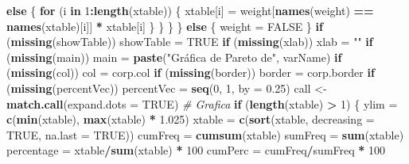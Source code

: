 \documentclass[
]{book}
\newenvironment{Shaded}{\begin{snugshade}}{\end{snugshade}}
\newcommand{\AttributeTok}[1]{\textcolor[rgb]{0.13,0.29,0.53}{#1}}
\newcommand{\CommentTok}[1]{\textcolor[rgb]{0.56,0.35,0.01}{\textit{#1}}}
\newcommand{\ConstantTok}[1]{\textcolor[rgb]{0.56,0.35,0.01}{#1}}
\newcommand{\ControlFlowTok}[1]{\textcolor[rgb]{0.13,0.29,0.53}{\textbf{#1}}}
\newcommand{\DecValTok}[1]{\textcolor[rgb]{0.00,0.00,0.81}{#1}}
\newcommand{\FloatTok}[1]{\textcolor[rgb]{0.00,0.00,0.81}{#1}}
\newcommand{\FunctionTok}[1]{\textcolor[rgb]{0.13,0.29,0.53}{\textbf{#1}}}
\newcommand{\NormalTok}[1]{#1}
\newcommand{\OtherTok}[1]{\textcolor[rgb]{0.56,0.35,0.01}{#1}}
\newcommand{\SpecialCharTok}[1]{\textcolor[rgb]{0.81,0.36,0.00}{\textbf{#1}}}
\newcommand{\StringTok}[1]{\textcolor[rgb]{0.31,0.60,0.02}{#1}}
\begin{document}
\begin{Shaded}
\begin{Highlighting}[]
      \ControlFlowTok{else}\NormalTok{ \{}
        \ControlFlowTok{for}\NormalTok{ (i }\ControlFlowTok{in} \DecValTok{1}\SpecialCharTok{:}\FunctionTok{length}\NormalTok{(xtable)) \{}
\NormalTok{          xtable[i] }\OtherTok{=}\NormalTok{ weight[}\FunctionTok{names}\NormalTok{(weight) }\SpecialCharTok{==} \FunctionTok{names}\NormalTok{(xtable)[i]] }\SpecialCharTok{*} 
\NormalTok{            xtable[i]}
\NormalTok{        \}}
\NormalTok{      \}}
\NormalTok{    \}}
\NormalTok{  \}}
  \ControlFlowTok{else}\NormalTok{ \{}
\NormalTok{    weight }\OtherTok{=} \ConstantTok{FALSE}
\NormalTok{  \}}
  \ControlFlowTok{if}\NormalTok{ (}\FunctionTok{missing}\NormalTok{(showTable)) }
\NormalTok{    showTable }\OtherTok{=} \ConstantTok{TRUE}
  \ControlFlowTok{if}\NormalTok{ (}\FunctionTok{missing}\NormalTok{(xlab)) }
\NormalTok{    xlab }\OtherTok{=} \StringTok{""}
  \ControlFlowTok{if}\NormalTok{ (}\FunctionTok{missing}\NormalTok{(main)) }
\NormalTok{    main }\OtherTok{=} \FunctionTok{paste}\NormalTok{(}\StringTok{"Gráfica de Pareto de"}\NormalTok{, varName)}
  \ControlFlowTok{if}\NormalTok{ (}\FunctionTok{missing}\NormalTok{(col)) }
\NormalTok{    col }\OtherTok{=}\NormalTok{ corp.col}
  \ControlFlowTok{if}\NormalTok{ (}\FunctionTok{missing}\NormalTok{(border)) }
\NormalTok{    border }\OtherTok{=}\NormalTok{ corp.border}
  \ControlFlowTok{if}\NormalTok{ (}\FunctionTok{missing}\NormalTok{(percentVec)) }
\NormalTok{    percentVec }\OtherTok{=} \FunctionTok{seq}\NormalTok{(}\DecValTok{0}\NormalTok{, }\DecValTok{1}\NormalTok{, }\AttributeTok{by =} \FloatTok{0.25}\NormalTok{)}
\NormalTok{  call }\OtherTok{\textless{}{-}} \FunctionTok{match.call}\NormalTok{(}\AttributeTok{expand.dots =} \ConstantTok{TRUE}\NormalTok{)}
  \CommentTok{\# Grafica}
  \ControlFlowTok{if}\NormalTok{ (}\FunctionTok{length}\NormalTok{(xtable) }\SpecialCharTok{\textgreater{}} \DecValTok{1}\NormalTok{) \{}
\NormalTok{    ylim }\OtherTok{=} \FunctionTok{c}\NormalTok{(}\FunctionTok{min}\NormalTok{(xtable), }\FunctionTok{max}\NormalTok{(xtable) }\SpecialCharTok{*} \FloatTok{1.025}\NormalTok{)}
\NormalTok{    xtable }\OtherTok{=} \FunctionTok{c}\NormalTok{(}\FunctionTok{sort}\NormalTok{(xtable, }\AttributeTok{decreasing =} \ConstantTok{TRUE}\NormalTok{, }\AttributeTok{na.last =} \ConstantTok{TRUE}\NormalTok{))}
\NormalTok{    cumFreq }\OtherTok{=} \FunctionTok{cumsum}\NormalTok{(xtable)}
\NormalTok{    sumFreq }\OtherTok{=} \FunctionTok{sum}\NormalTok{(xtable)}
\NormalTok{    percentage }\OtherTok{=}\NormalTok{ xtable}\SpecialCharTok{/}\FunctionTok{sum}\NormalTok{(xtable) }\SpecialCharTok{*} \DecValTok{100}
\NormalTok{    cumPerc }\OtherTok{=}\NormalTok{ cumFreq}\SpecialCharTok{/}\NormalTok{sumFreq }\SpecialCharTok{*} \DecValTok{100}  
    

\end{Highlighting}
\end{Shaded}
\end{document}
